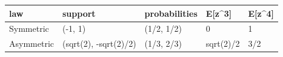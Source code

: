 \begin{tabular}{lllll}
law & support & probabilities & E[z\textasciicircum{}3] & E[z\textasciicircum{}4] \\
\hline
Symmetric & (-1, 1) & (1/2, 1/2) & 0 & 1 \\
Asymmetric & (sqrt(2), -sqrt(2)/2) & (1/3, 2/3) & sqrt(2)/2 & 3/2 \\
\end{tabular}
